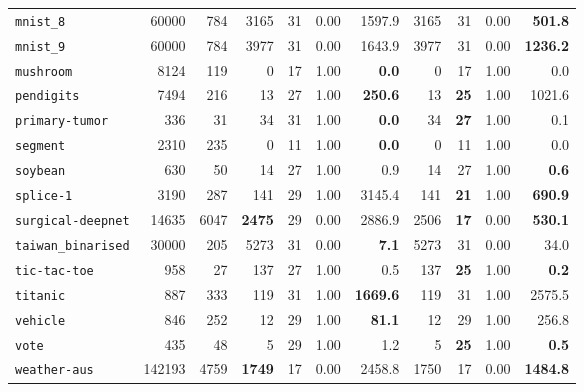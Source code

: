 \begin{tabular}{lccrrrrrrrr}
\texttt{mnist\_8} & \multicolumn{1}{r}{60000} & \multicolumn{1}{r}{784}  & 3165 & 31 & 0.00 & 1597.9 & 3165 & 31 & 0.00 & \textbf{501.8}\\
\texttt{mnist\_9} & \multicolumn{1}{r}{60000} & \multicolumn{1}{r}{784}  & 3977 & 31 & 0.00 & 1643.9 & 3977 & 31 & 0.00 & \textbf{1236.2}\\
\texttt{mushroom} & \multicolumn{1}{r}{8124} & \multicolumn{1}{r}{119}  & 0 & 17 & 1.00 & \textbf{0.0} & 0 & 17 & 1.00 & 0.0\\
\texttt{pendigits} & \multicolumn{1}{r}{7494} & \multicolumn{1}{r}{216}  & 13 & 27 & 1.00 & \textbf{250.6} & 13 & \textbf{25} & 1.00 & 1021.6\\
\texttt{primary-tumor} & \multicolumn{1}{r}{336} & \multicolumn{1}{r}{31}  & 34 & 31 & 1.00 & \textbf{0.0} & 34 & \textbf{27} & 1.00 & 0.1\\
\texttt{segment} & \multicolumn{1}{r}{2310} & \multicolumn{1}{r}{235}  & 0 & 11 & 1.00 & \textbf{0.0} & 0 & 11 & 1.00 & 0.0\\
\texttt{soybean} & \multicolumn{1}{r}{630} & \multicolumn{1}{r}{50}  & 14 & 27 & 1.00 & 0.9 & 14 & 27 & 1.00 & \textbf{0.6}\\
\texttt{splice-1} & \multicolumn{1}{r}{3190} & \multicolumn{1}{r}{287}  & 141 & 29 & 1.00 & 3145.4 & 141 & \textbf{21} & 1.00 & \textbf{690.9}\\
\texttt{surgical-deepnet} & \multicolumn{1}{r}{14635} & \multicolumn{1}{r}{6047}  & \textbf{2475} & 29 & 0.00 & 2886.9 & 2506 & \textbf{17} & 0.00 & \textbf{530.1}\\
\texttt{taiwan\_binarised} & \multicolumn{1}{r}{30000} & \multicolumn{1}{r}{205}  & 5273 & 31 & 0.00 & \textbf{7.1} & 5273 & 31 & 0.00 & 34.0\\
\texttt{tic-tac-toe} & \multicolumn{1}{r}{958} & \multicolumn{1}{r}{27}  & 137 & 27 & 1.00 & 0.5 & 137 & \textbf{25} & 1.00 & \textbf{0.2}\\
\texttt{titanic} & \multicolumn{1}{r}{887} & \multicolumn{1}{r}{333}  & 119 & 31 & 1.00 & \textbf{1669.6} & 119 & 31 & 1.00 & 2575.5\\
\texttt{vehicle} & \multicolumn{1}{r}{846} & \multicolumn{1}{r}{252}  & 12 & 29 & 1.00 & \textbf{81.1} & 12 & 29 & 1.00 & 256.8\\
\texttt{vote} & \multicolumn{1}{r}{435} & \multicolumn{1}{r}{48}  & 5 & 29 & 1.00 & 1.2 & 5 & \textbf{25} & 1.00 & \textbf{0.5}\\
\texttt{weather-aus} & \multicolumn{1}{r}{142193} & \multicolumn{1}{r}{4759}  & \textbf{1749} & 17 & 0.00 & 2458.8 & 1750 & 17 & 0.00 & \textbf{1484.8}\\

\end{tabular}
